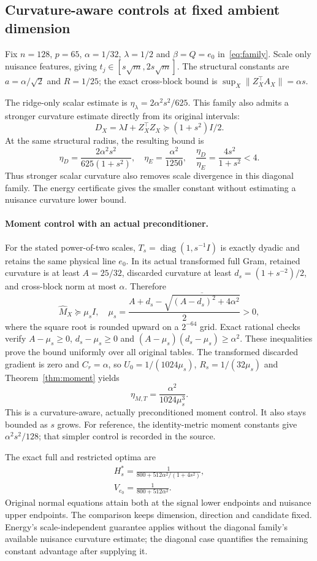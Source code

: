 \subsection{Curvature-aware controls at fixed ambient dimension}\label{app:scale-v80}
Fix $n=128$, $p=65$, $\alpha=1/32$, $\lambda=1/2$ and $\beta=Q=e_0$ in~\eqref{eq:family}. Scale only nuisance features, giving $t_j\in[s\sqrt m,2s\sqrt m]$. The structural constants are $a=\alpha/\sqrt2$ and $R=1/25$; the exact cross-block bound is $\sup_X\|Z_X^\top A_X\|=\alpha s$.

The ridge-only scalar estimate is $\eta_\lambda=2\alpha^2s^2/625$. This family also admits a stronger curvature estimate directly from its original intervals:
\[
 D_X=\lambda I+Z_X^\top Z_X\succeq (1+s^2)I/2.
\]
At the same structural radius, the resulting bound is
\[
 \eta_D=\frac{2\alpha^2s^2}{625(1+s^2)},\quad
 \eta_E=\frac{\alpha^2}{1250},\quad
 \frac{\eta_D}{\eta_E}=\frac{4s^2}{1+s^2}<4.
\]
Thus stronger scalar curvature also removes scale divergence in this diagonal family. The energy certificate gives the smaller constant without estimating a nuisance curvature lower bound.

\paragraph{Moment control with an actual preconditioner.}
For the stated power-of-two scales, $T_s=\operatorname{diag}(1,s^{-1}I)$ is exactly dyadic and retains the same physical line $e_0$. In its actual transformed full Gram, retained curvature is at least $A=25/32$, discarded curvature at least $d_s=(1+s^{-2})/2$, and cross-block norm at most $\alpha$. Therefore
\[
 \widehat M_X\succeq\mu_s I,\quad
 \mu_s=\frac{A+d_s-\overline{\sqrt{(A-d_s)^2+4\alpha^2}}}{2}>0,
\]
where the square root is rounded upward on a $2^{-64}$ grid. Exact rational checks verify $A-\mu_s\ge0$, $d_s-\mu_s\ge0$ and $(A-\mu_s)(d_s-\mu_s)\ge\alpha^2$. These inequalities prove the bound uniformly over all original tables. The transformed discarded gradient is zero and $C_r=\alpha$, so $U_0=1/(1024\mu_s)$, $R_s=1/(32\mu_s)$ and Theorem~\ref{thm:moment} yields
\[
 \eta_{M,T}=\frac{\alpha^2}{1024\mu_s^3}.
\]
This is a curvature-aware, actually preconditioned moment control. It also stays bounded as $s$ grows. For reference, the identity-metric moment constants give $\alpha^2s^2/128$; that simpler control is recorded in the source.

The exact full and restricted optima are
\[
 \begin{gathered}
 H_s^*=\frac1{800+512\alpha^2/(1+4s^2)},\\
 V_{e_0}=\frac1{800+512\alpha^2}.
 \end{gathered}
\]
Original normal equations attain both at the signal lower endpoints and nuisance upper endpoints. The comparison keeps dimension, direction and candidate fixed. Energy's scale-independent guarantee applies without the diagonal family's available nuisance curvature estimate; the diagonal case quantifies the remaining constant advantage after supplying it.

